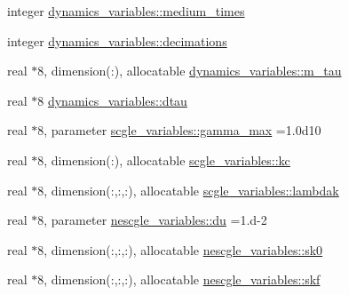 \begin{DoxyCompactItemize}
\item 
integer \hyperlink{namespacedynamics__variables_a12f963fbaf3733c50be7b2eb013133f6}{dynamics\+\_\+variables\+::medium\+\_\+times}
\item 
integer \hyperlink{namespacedynamics__variables_a779c965a5816a34b1bc10ea35aec740b}{dynamics\+\_\+variables\+::decimations}
\item 
real $\ast$8, dimension(\+:), allocatable \hyperlink{namespacedynamics__variables_a3bba8f0483c8ea097be9ffbcd0ccbdc5}{dynamics\+\_\+variables\+::m\+\_\+tau}
\item 
real $\ast$8 \hyperlink{namespacedynamics__variables_aceafdd63e4e63ce7758f0052ca50638f}{dynamics\+\_\+variables\+::dtau}
\item 
real $\ast$8, parameter \hyperlink{namespacescgle__variables_aa92e885e5d32c4141d1833b1765ee604}{scgle\+\_\+variables\+::gamma\+\_\+max} =1.\+0d10
\item 
real $\ast$8, dimension(\+:), allocatable \hyperlink{namespacescgle__variables_a10888cee3ad8e6e62e0d124978767fa5}{scgle\+\_\+variables\+::kc}
\item 
real $\ast$8, dimension(\+:,\+:,\+:), allocatable \hyperlink{namespacescgle__variables_a5adad1368d8a9059bbe1bca9352e7143}{scgle\+\_\+variables\+::lambdak}
\item 
real $\ast$8, parameter \hyperlink{namespacenescgle__variables_ab14faa799c9e46997e24517681585bc2}{nescgle\+\_\+variables\+::du} =1.d-\/2
\item 
real $\ast$8, dimension(\+:,\+:,\+:), allocatable \hyperlink{namespacenescgle__variables_a048c355abe51e4b0aee3f618d9a67caf}{nescgle\+\_\+variables\+::sk0}
\item 
real $\ast$8, dimension(\+:,\+:,\+:), allocatable \hyperlink{namespacenescgle__variables_af17f5ac212eaac0b60106deab33ab8af}{nescgle\+\_\+variables\+::skf}
\end{DoxyCompactItemize}
